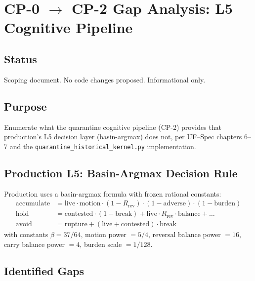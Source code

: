 \documentclass[11pt,a4paper]{article}
\begin{document}
\section{CP-0 $\to$ CP-2 Gap Analysis: L5 Cognitive Pipeline}
\label{sec:gap-analysis}

\subsection{Status}
Scoping document. No code changes proposed. Informational only.

\subsection{Purpose}
Enumerate what the quarantine cognitive pipeline (CP-2) provides that
production's L5 decision layer (basin-argmax) does not, per UF--Spec
chapters 6--7 and the \texttt{quarantine\_historical\_kernel.py} implementation.

\subsection{Production L5: Basin-Argmax Decision Rule}

Production uses a basin-argmax formula with frozen rational constants:
\begin{align}
    \text{accumulate} &= \text{live} \cdot \text{motion} \cdot (1 - R_{\text{rev}})
        \cdot (1 - \text{adverse}) \cdot (1 - \text{burden}) \\
    \text{hold} &= \text{contested} \cdot (1 - \text{break}) + \text{live} \cdot
        R_{\text{rev}} \cdot \text{balance} + \ldots \\
    \text{avoid} &= \text{rupture} + (\text{live} + \text{contested}) \cdot \text{break}
\end{align}
with constants $\beta = 37/64$, motion power $= 5/4$, reversal balance power $= 16$,
carry balance power $= 4$, burden scale $= 1/128$.

\subsection{Identified Gaps}
\end{document}
